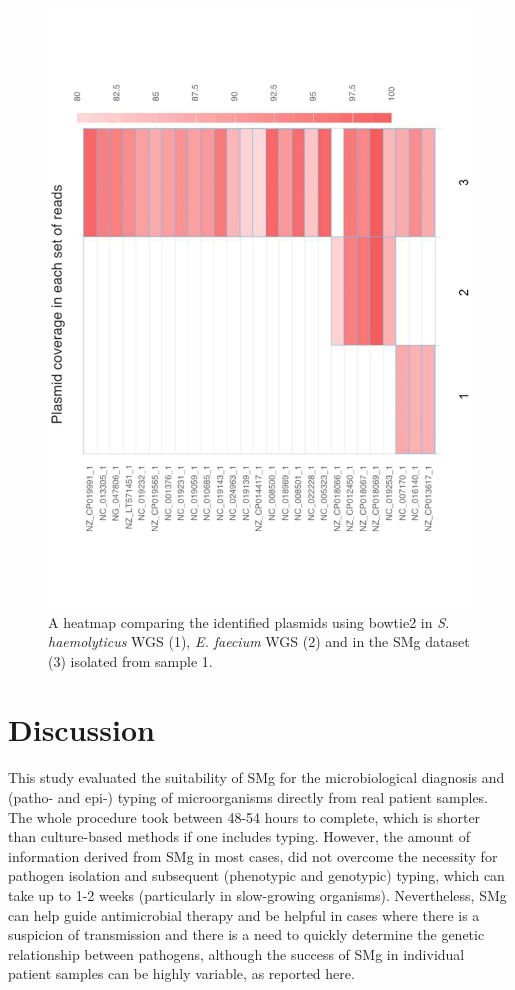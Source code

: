 \begin{figure}[h!]
\centering
\includegraphics[angle=-90,width=\textwidth]{figures/chapter 2/41598_2018_31873_Fig4_HTML.pdf}
\caption{A heatmap comparing the identified plasmids using bowtie2 in \textit{S. haemolyticus} WGS (1),\textit{ E. faecium} WGS (2) and in the SMg dataset (3) isolated from sample 1.}
\label{fig:chap2_figure4}
\end{figure}

\section{Discussion}

This study evaluated the suitability of SMg for the microbiological diagnosis and (patho- and epi-) typing of microorganisms directly from real patient samples. The whole procedure took between 48-54 hours to complete, which is shorter than culture-based methods if one includes typing. However, the amount of information derived from SMg in most cases, did not overcome the necessity for pathogen isolation and subsequent (phenotypic and genotypic) typing, which can take up to 1-2 weeks (particularly in slow-growing organisms). Nevertheless, SMg can help guide antimicrobial therapy and be helpful in cases where there is a suspicion of transmission and there is a need to quickly determine the genetic relationship between pathogens, although the success of SMg in individual patient samples can be highly variable, as reported here.


